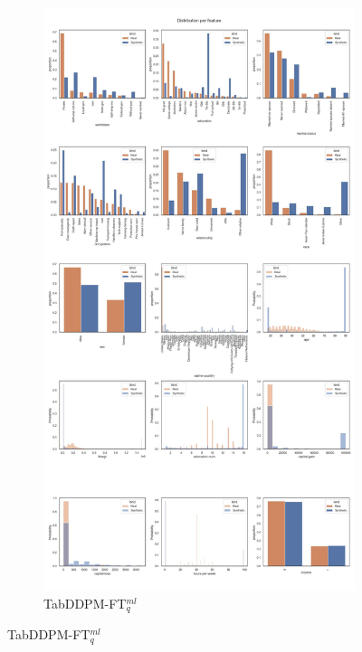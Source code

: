 \newpage
\begin{landscape}
	\begin{figure}[h]
		\centering
		\hfill
		\begin{subfigure}{0.4\linewidth}
			\includegraphics[height=\textheight,width=\linewidth,keepaspectratio]{images/distributions_full/tab-ddpm-ft.jpg}
			\caption{TabDDPM-FT$^{ml}_q$}
		\end{subfigure}

\end{figure}
\end{landscape}
